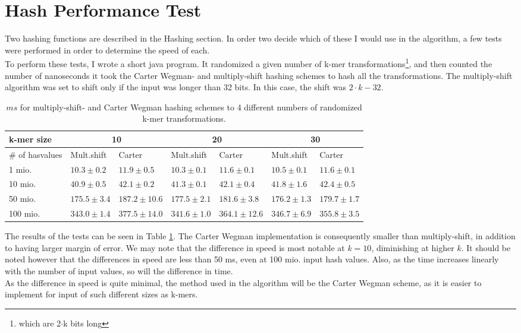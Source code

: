 \documentclass[../../main.tex]{subfiles}
\begin{document}
\section{Hash Performance Test}
\label{sec:hashtest}

Two hashing functions are described in the Hashing section. In order two decide which of these I would use in the algorithm, a few tests were performed in order to determine the speed of each.\\

To perform these tests, I wrote a short java program. It randomized a given number of k-mer transformations\footnote{which are 2$\cdot$k bits long}, and then counted the number of nanoseconds it took the Carter Wegman- and multiply-shift hashing schemes to hash all the transformations. The multiply-shift algorithm was set to shift only if the input was longer than 32 bits. In this case, the shift was $2\cdot k - 32$.\\

\begin{table}[h]
\begin{tabular}{| l | l | l | l | l | l | l |}
\hline
k-mer size & \multicolumn{2}{c|}{10} & \multicolumn{2}{c|}{20} & \multicolumn{2}{c|}{30} \\
\hline
\# of hasvalues & Mult.shift & Carter & Mult.shift & Carter & Mult.shift & Carter \\
 \hline
1 mio. & $10.3\pm 0.2$ & $11.9\pm 0.5$ & $10.3\pm 0.1$ & $11.6\pm 0.1$ & $10.5\pm 0.1$ & $11.6\pm 0.1$\\
10 mio. & $40.9\pm 0.5$ & $42.1\pm0.2$ & $41.3\pm 0.1$ & $42.1\pm0.4$ & $41.8\pm 1.6$ & $42.4\pm0.5$\\
50 mio. & $175.5\pm3.4$ & $187.2\pm 10.6$ & $177.5\pm2.1$  & $181.6\pm3.8$ & $176.2\pm1.3$ & $179.7\pm1.7$\\
100 mio. & $343.0\pm1.4$ & $377.5\pm14.0$ & $341.6\pm1.0$ & $364.1\pm12.6$ & $346.7\pm6.9$ & $355.8\pm3.5$\\
\hline
\end{tabular}
\caption{$ms$ for multiply-shift- and Carter Wegman hashing schemes to 4 different numbers of randomized k-mer transformations.}
\label{table:hashTest}
\end{table}

The results of the tests can be seen in Table \ref{table:hashTest}. The Carter Wegman implementation is consequently smaller than multiply-shift, in addition to having larger margin of error. We may note that the difference in speed is most notable at $k=10$, diminishing at higher $k$. It should be noted however that the differences in speed are less than 50 ms, even at 100 mio. input hash values. Also, as the time increases linearly with the number of input values, so will the difference in time.\\

As the difference in speed is quite minimal, the method used in the algorithm will be the Carter Wegman scheme, as it is easier to implement for input of such different sizes as k-mers.
\end{document}
